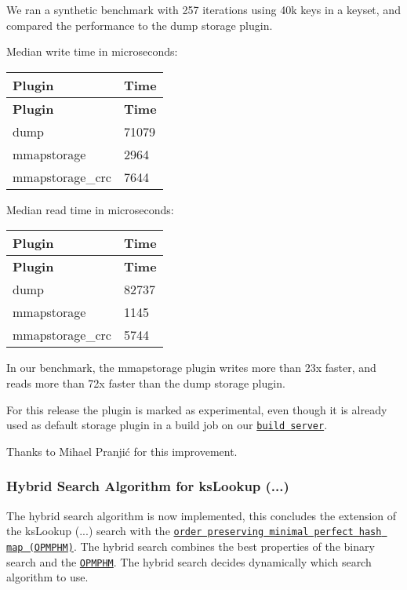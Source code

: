 We ran a synthetic benchmark with 257 iterations using 40k keys in a keyset, and compared the performance to the {\ttfamily dump} storage plugin.

Median write time in microseconds\+:

\tabulinesep=1mm
\begin{longtabu} spread 0pt [c]{*{2}{|X[-1]}|}
\hline
\rowcolor{\tableheadbgcolor}\textbf{ Plugin }&\textbf{ Time  }\\
\endfirsthead
\hline
\endfoot
\hline
\rowcolor{\tableheadbgcolor}\textbf{ Plugin }&\textbf{ Time  }\\
\endhead
{\ttfamily dump} &71079 \\
{\ttfamily mmapstorage} &2964 \\
{\ttfamily mmapstorage\+\_\+crc} &7644 \\
\end{longtabu}
Median read time in microseconds\+:

\tabulinesep=1mm
\begin{longtabu} spread 0pt [c]{*{2}{|X[-1]}|}
\hline
\rowcolor{\tableheadbgcolor}\textbf{ Plugin }&\textbf{ Time  }\\
\endfirsthead
\hline
\endfoot
\hline
\rowcolor{\tableheadbgcolor}\textbf{ Plugin }&\textbf{ Time  }\\
\endhead
{\ttfamily dump} &82737 \\
{\ttfamily mmapstorage} &1145 \\
{\ttfamily mmapstorage\+\_\+crc} &5744 \\
\end{longtabu}
In our benchmark, the {\ttfamily mmapstorage} plugin writes more than 23x faster, and reads more than 72x faster than the {\ttfamily dump} storage plugin.

For this release the plugin is marked as experimental, even though it is already used as default storage plugin in a build job on our \href{https://build.libelektra.org}{\tt build server}.

Thanks to Mihael Pranjić for this improvement.

\subsubsection*{Hybrid Search Algorithm for {\ttfamily ks\+Lookup (...)}}

The hybrid search algorithm is now implemented, this concludes the extension of the {\ttfamily ks\+Lookup (...)} search with the \href{https://master.libelektra.org/doc/dev/data-structures.md#order-preserving-minimal-perfect-hash-map-aka-opmphm}{\tt order preserving minimal perfect hash map (O\+P\+M\+P\+HM)}. The hybrid search combines the best properties of the binary search and the \href{https://master.libelektra.org/doc/dev/data-structures.md#order-preserving-minimal-perfect-hash-map-aka-opmphm}{\tt O\+P\+M\+P\+HM}. The hybrid search decides dynamically which search algorithm to use.

